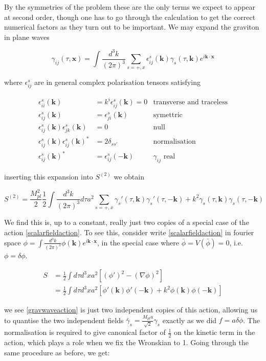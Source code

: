\documentclass[a4paper,11pt]{article}
\renewcommand{\v}[1]{\mathbf{#1}}
\newcommand{\Mp}{M_{pl}}
\newcommand{\half}{\frac{1}{2}}
\newcommand{\bphi}{\bar{\phi}}
\newcommand{\fint}[1]{\int \frac{d^3 #1}{(2\pi)^3}}
\begin{document}
By the symmetries of the problem these are the only terms we expect to appear at second order, though one has to go through the calculation to get the correct numerical factors as they turn out to be important. We may expand the graviton in plane waves 

\begin{equation}
\gamma_{ij}(\tau, \v{x}) = \fint{k} \sum_{s=+,x} \epsilon_{ij}^s(\v{k})\gamma_s(\tau,\v{k})e^{i\v{k}\cdot\v{x}}
\end{equation}

where $\epsilon_{ij}^s$ are in general complex polarisation tensors satisfying


\begin{align}
\epsilon_{ii}^s(\v{k}) &= k^i \epsilon_{ij}^s(\v{k}) = 0 &\text{transverse and traceless}\\
\epsilon_{ij}^s(\v{k}) &= \epsilon_{ji}^s(\v{k}) &\text{symettric}\\
\epsilon_{ij}^s(\v{k})\epsilon_{jk}^s(\v{k}) &= 0&\text{null}\\
\epsilon_{ij}^s(\v{k})\epsilon_{ij}^s(\v{k})^* &= 2\delta_{ss'} &\text{normalisation}\\
\epsilon_{ij}^s(\v{k})^* &= \epsilon_{ij}^s(\v{-k})&\text{$\gamma_{ij}$ real}
\end{align}

inserting this expansion into $S^{(2)}$ we obtain 

\begin{equation}
S^{(2)} = \frac{\Mp^2}{2} \half \fint{k} d\tau a^2 \sum_{s=+,x} \gamma_s'(\tau,\v{k})\gamma_s '(\tau,\v{-k})+k^2 \gamma_s(\tau,\v{k})\gamma_s (\tau,\v{-k})
\label{gravwaveaction}
\end{equation}

We find this is, up to a constant, really just two copies of a special case of the action \ref{scalarfieldaction}. To see this, consider write \ref{scalarfieldaction} in fourier space $\phi = \fint{k} \phi(\v{k})e^{i\v{k}\cdot\v{x}}$, in the special case where $\bphi = V(\bphi) = 0$, i.e. $\phi = \delta \phi$.


\begin{align}
S &= \half \int d\tau d^3x a^2 [(\phi ' )^2 -(\nabla \phi)^2]\\
 &= \half \int d\tau d^3x a^2 [\phi'(\v{k})\phi'(\v{-k}) + k^2 \phi(\v{k})\phi(\v{-k})]
\end{align}

we see \ref{gravwaveaction} is just two independent copies of this action, allowing us to quantise the two independent fields $\tilde{\gamma_s} = \frac{\Mp a}{\sqrt{2}} \gamma_s$ exactly as we did $ f = a \delta \phi$. The normalisation is required to give canonical factor of $\half$ on the kinetic term in the action, which plays a role when we fix the Wronskian to 1. Going through the same procedure as before, we get:
\end{document}
